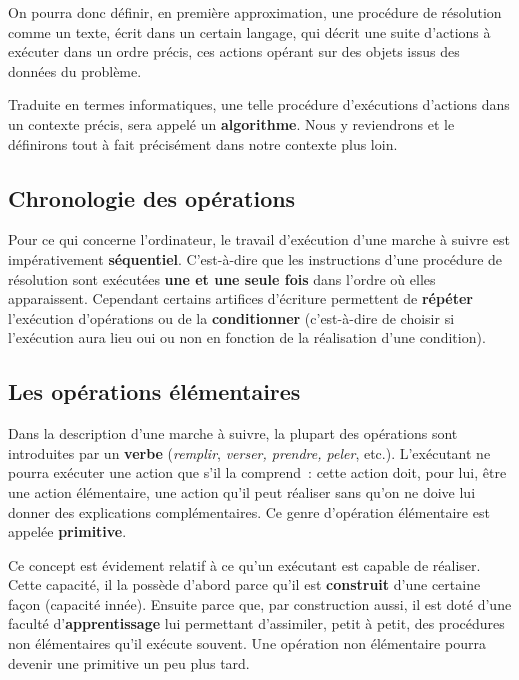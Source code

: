 		On pourra donc définir, en première approximation, 
		une procédure de résolution comme un texte, 
		écrit dans un certain langage, 
		qui décrit une suite d’actions à exécuter dans un ordre précis, 
		ces actions opérant sur des objets issus des données du problème.
		
		Traduite en termes informatiques, une telle procédure d'exécutions d'actions
		dans un contexte précis, sera appelé un \textbf{algorithme}. Nous y reviendrons
		et le définirons tout à fait précisément dans notre contexte plus loin.
	
		\subsection{Chronologie des opérations}
		
			Pour ce qui concerne l’ordinateur, 
			le travail d’exécution d’une marche à suivre 
			est impérativement \textbf{séquentiel}. 
			C’est-à-dire que les instructions d’une procédure de résolution 
			sont exécutées \textbf{une et une seule fois} 
			dans l’ordre où elles apparaissent.
			Cependant certains artifices d’écriture 
			permettent de \textbf{répéter} l’exécution d’opérations 
			ou de la \textbf{conditionner}
			(c’est-à-dire de choisir si l’exécution aura lieu oui ou non 
			en fonction de la réalisation d’une condition).
	
		\subsection{Les opérations élémentaires}
		
			Dans la description d’une marche à suivre, 
			la plupart des opérations sont introduites par un \textbf{verbe}
			(\textit{remplir}, \textit{verser, prendre, peler}, etc.). 
			L’exécutant ne pourra exécuter une action que s’il la comprend~:
			cette action doit, pour lui, être une action élémentaire, 
			une action qu’il peut réaliser 
			sans qu’on ne doive lui donner des explications complémentaires. 
			Ce genre d’opération élémentaire est appelée \textbf{primitive}.
			
			Ce concept est évidement relatif 
			à ce qu’un exécutant est capable de réaliser. 
			Cette capacité, il la possède d’abord 
			parce qu’il est \textbf{construit} d’une certaine façon 
			(capacité innée). 
			Ensuite parce que, par construction aussi, 
			il est doté d’une faculté d’\textbf{apprentissage} 
			lui permettant d’assimiler, petit à petit, 
			des procédures non élémentaires qu’il exécute souvent. 
			Une opération non élémentaire 
			pourra devenir une primitive un peu plus tard.
			
